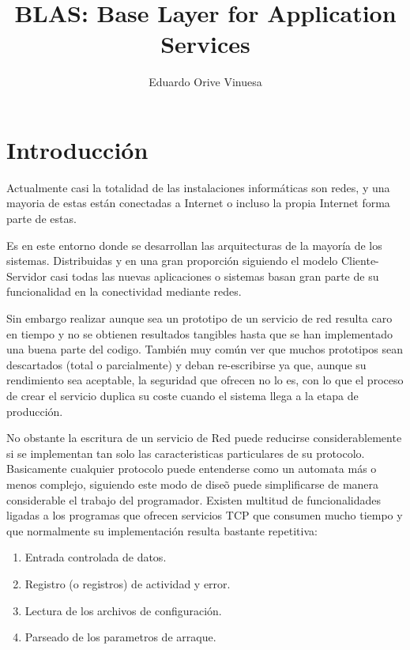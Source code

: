 \documentclass[a4paper,spanish,12pt]{book}
\title{BLAS: Base Layer for Application Services}
\author{Eduardo Orive Vinuesa}
\begin{document}
\tableofcontents

\maketitle



\chapter*{Introducción}
Actualmente casi la totalidad de las instalaciones inform\'aticas son redes, y una mayoria de estas est\'an conectadas a Internet o incluso la propia Internet forma parte de estas. 

Es en este entorno donde se desarrollan las arquitecturas de la mayor\'ia de los sistemas. Distribuidas y en una gran proporci\'on siguiendo el modelo Cliente-Servidor casi todas las nuevas aplicaciones o sistemas basan gran parte de su funcionalidad en la conectividad mediante redes. 

Sin embargo realizar aunque sea un prototipo de un servicio de red resulta caro en tiempo y no se obtienen resultados tangibles hasta que se han implementado una buena parte del codigo.
Tambi\'en muy com\'un ver que muchos prototipos sean descartados (total o parcialmente) y deban re-escribirse ya que, aunque su rendimiento sea aceptable, la seguridad que ofrecen no lo es, con lo que el proceso de crear el servicio duplica su coste cuando el sistema llega a la etapa de producci\'on.

No obstante la escritura de un servicio de Red puede reducirse considerablemente si se implementan tan solo las caracteristicas particulares de su protocolo. Basicamente cualquier protocolo puede entenderse como un automata m\'as o menos complejo, siguiendo este modo de dise\~{o} puede simplificarse de manera considerable el trabajo del programador.
Existen multitud de funcionalidades ligadas a los programas que ofrecen servicios TCP que consumen mucho tiempo y que normalmente su implementaci\'on resulta bastante repetitiva:
\begin{enumerate}
	\item Entrada controlada de datos.
	\item Registro (o registros) de actividad y error.
	\item Lectura de los archivos de configuraci\'on.
	\item Parseado de los parametros de arraque.
\end{enumerate}
\end{document}
